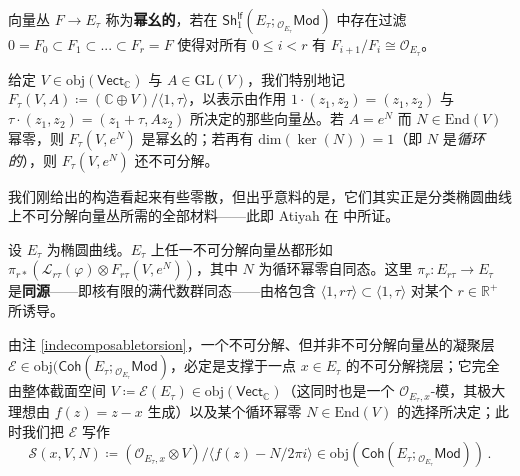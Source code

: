 \begin{Def}\label{unipotentvectorbundle}
	向量丛 $F\rightarrow E_\tau$ 称为\textbf{幂幺的}，若在 $\mathsf{Sh}^\mathsf{lf}_1(E_\tau;{}_{\mathcal{O}_{E_\tau}}\!\mathsf{Mod})$ 中存在过滤 $0=F_0\subset F_1\subset...\subset F_r=F$ 使得对所有 $0\leq i< r$ 有 $F_{i+1}/F_i\cong\mathcal{O}_{E_\tau}$。

	给定 $V\in\text{obj}(\mathsf{Vect}_\mathbb{C})$ 与 $A\in\text{GL}(V)$，我们特别地记 $F_\tau(V,A)\!\coloneqq(\mathbb{C}\oplus V)/\langle 1,\tau\rangle$，以表示由作用 $1\cdot(z_1,z_2)=(z_1,z_2)$ 与 $\tau\cdot(z_1,z_2)=(z_1+\tau,Az_2)$ 所决定的那些向量丛。若 $A=e^N$ 而 $N\in\text{End}(V)$ 幂零，则 $F_\tau(V,e^N)$ 是幂幺的；若再有 $\text{dim}(\ker(N))=1$（即 $N$ 是\textit{循环的}），则 $F_\tau(V,e^N)$ 还不可分解。
\end{Def}

我们刚给出的构造看起来有些零散，但出乎意料的是，它们其实正是分类椭圆曲线上不可分解向量丛所需的全部材料——此即 Atiyah 在 \cite{[Ati57]} 中所证。

\begin{Thm}\label{AtiyahThm}
	设 $E_\tau$ 为椭圆曲线。$E_\tau$ 上任一不可分解向量丛都形如 $\pi_{r*}(\mathcal{L}_{r\tau}(\varphi)\otimes F_{r\tau}(V,e^N))$，其中 $N$ 为循环幂零自同态。这里 $\pi_r:E_{r\tau}\rightarrow E_\tau$ 是\textbf{同源}——即核有限的满代数群同态——由格包含 $\langle 1,r\tau\rangle\subset\langle 1,\tau\rangle$ 对某个 $r\in\mathbb{R}^+$ 所诱导。
\end{Thm}


由注 \ref{indecomposabletorsion}，一个不可分解、但并非不可分解向量丛的凝聚层 $\mathcal{E}\in\text{obj}(\mathsf{Coh}(E_\tau;{}_{\mathcal{O}_{E_\tau}}\!\mathsf{Mod})$，必定是支撑于一点 $x\in E_\tau$ 的不可分解挠层；它完全由整体截面空间 $V\coloneqq\mathcal{E}(E_\tau)\in\text{obj}(\mathsf{Vect}_\mathbb{C})$（这同时也是一个 $\mathcal{O}_{E_\tau,x}$-模，其极大理想由 $f(z)=z-x$ 生成）以及某个循环幂零 $N\in\text{End}(V)$ 的选择所决定；此时我们把 $\mathcal{E}$ 写作
\begin{equation}\label{elliptictorsionsheaf}
\mathcal{S}(x,V,N)\coloneqq(\mathcal{O}_{E_\tau,x}\otimes V)/\langle f(z)-N/2\pi i\rangle\in\text{obj}(\mathsf{Coh}(E_\tau;{}_{\mathcal{O}_{E_\tau}}\!\mathsf{Mod}))\,.
\end{equation}

